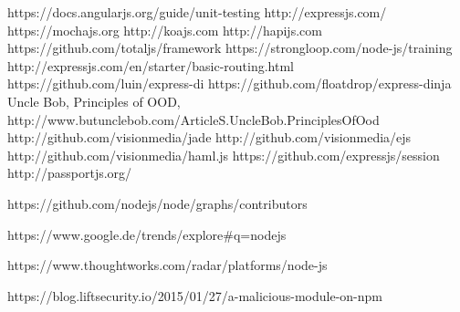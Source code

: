 \documentclass[twoside=true, %
  DIV=15,%
  BCOR=15mm, %
  chapterprefix=false,
  headinclude=true,
  footinclude=false,
  pagesize,%
  fontsize=11pt,%
  paper=a4,%
  bibliography=totoc,%
  index=totoc,%
  cleardoublepage=plain,%
  headings=big,%
  listof=flat,%
  numbers=noenddot
  ]{scrbook}
\begin{document}
	\begin{thebibliography}{9}
		
		
		https://docs.angularjs.org/guide/unit-testing
		http://expressjs.com/
		https://mochajs.org
		http://koajs.com
		http://hapijs.com
		https://github.com/totaljs/framework
		https://strongloop.com/node-js/training
		http://expressjs.com/en/starter/basic-routing.html
		https://github.com/luin/express-di
		https://github.com/floatdrop/express-dinja
		Uncle Bob,
		Principles of OOD,
		http://www.butunclebob.com/ArticleS.UncleBob.PrinciplesOfOod
		http://github.com/visionmedia/jade
		http://github.com/visionmedia/ejs
		http://github.com/visionmedia/haml.js
		https://github.com/expressjs/session
		http://passportjs.org/
				
		
		https://github.com/nodejs/node/graphs/contributors
		
		https://www.google.de/trends/explore\#q=nodejs
		
		https://www.thoughtworks.com/radar/platforms/node-js
		
		https://blog.liftsecurity.io/2015/01/27/a-malicious-module-on-npm
		
	\end{thebibliography}
\end{document}
